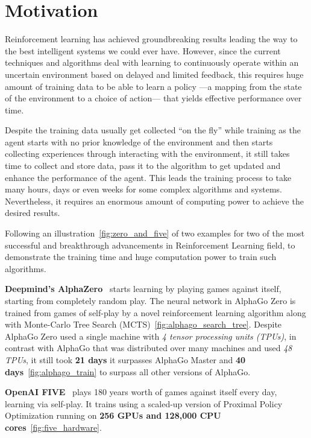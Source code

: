 \section{Motivation}

Reinforcement learning has achieved groundbreaking results leading the way to the best intelligent systems we could ever have.
However, since the current techniques and algorithms deal with learning to continuously operate within an uncertain environment based on delayed and limited feedback, this requires huge amount of training data to be able to learn a policy —a mapping from the state of the environment to a choice of action— that yields effective performance over time.

Despite the training data usually get collected ``on the fly'' while training as the agent starts with no prior knowledge of the environment and then starts collecting experiences through interacting with the environment, it still takes time to collect and store data, pass it to the algorithm to get updated and enhance the performance of the agent. This leads the training process to take many hours, days or even weeks for some complex algorithms and systems. Nevertheless, it requires an enormous amount of computing power to achieve the desired results. 

Following an illustration~\ref{fig:zero_and_five} of two examples for two of the most successful and breakthrough advancements in Reinforcement Learning field, to demonstrate the training time and huge computation power to train such algorithms.

\textbf{Deepmind's AlphaZero}~\parencite{silver2017mastering} starts learning by playing games against itself, starting from completely random play. The neural network in AlphaGo Zero is trained from games of self-play by a novel reinforcement learning algorithm along with Monte-Carlo Tree Search (MCTS)~\ref{fig:alphago_search_tree}. 
Despite AlphaGo Zero used a single machine with \textit{4 tensor processing units (TPUs)}, in contrast with AlphaGo that was distributed over many machines and used \textit{48 TPUs}, it still took \textbf{21 days} it surpasses AlphaGo Master and \textbf{40 days}~\ref{fig:alphago_train} to surpass all other versions of AlphaGo.

\textbf{OpenAI FIVE}~\parencite{OpenAI_dota} plays 180 years worth of games against itself every day, learning via self-play. It trains using a scaled-up version of Proximal Policy Optimization running on \textbf{256 GPUs and 128,000 CPU cores}~\ref{fig:five_hardware}.


